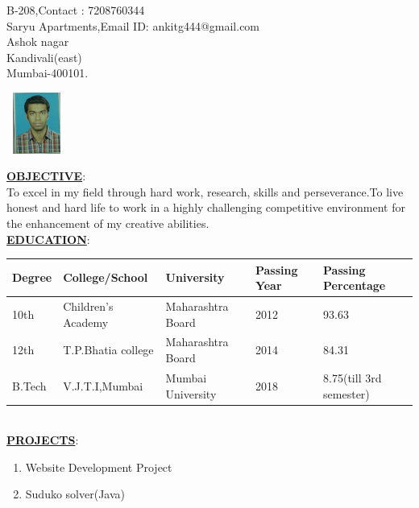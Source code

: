 \documentclass[a4paper,12pt]{article}
\begin{document}
\noindent\makebox[\linewidth]{\rule{170mm}{0.4pt}}
\begin{flushleft}
{B-208,\hfill{Contact : 7208760344} \\ Saryu Apartments,\hfill{Email ID: ankitg444@gmail.com}\\Ashok nagar\\Kandivali(east) \\Mumbai-400101.}
\end{flushleft}
\hfill\includegraphics[width=20mm,height=20mm]{Untitled}\\[1cm]
\begin{flushleft}

\underline{\textbf{OBJECTIVE}}:\\
To excel in my field through hard work, research, skills and perseverance.To live honest and hard life to work in a highly challenging competitive environment for the enhancement of my creative abilities.\\[0.5cm]

\underline{\textbf{EDUCATION}}:\\[0.5cm]
\begin{tabular}{ | m{2.5cm} | m{3cm}| m{2.5cm} | m{2.5cm}| m{3cm} | } 
\hline
Degree& College/School & University & Passing Year & Passing Percentage \\ 
\hline
10th & Children's Academy & Maharashtra Board & 2012 & 93.63 \\ 
\hline
12th & T.P.Bhatia college & Maharashtra Board & 2014 &84.31 \\ 
\hline
B.Tech & V.J.T.I,Mumbai & Mumbai University &2018 & 8.75(till 3rd semester) \\
\hline
\end{tabular}\\[0.5cm]
\underline{\textbf{PROJECTS}}:\\[0.5cm]
\begin{enumerate}
    \item {Website Development Project }
    \item{Suduko solver(Java)}
\end{enumerate}

\end{flushleft}
\end{document}
